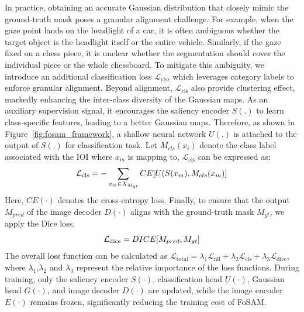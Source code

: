 \documentclass{article}
\begin{document}
In practice, obtaining an accurate Gaussian distribution that closely mimic the ground-truth mask poses a granular alignment challenge. For example, when the gaze point lands on the headlight of a car, it is often ambiguous whether the target object is the headlight itself or the entire vehicle. Similarly, if the gaze fixed on a chess piece, it is unclear whether the segmentation should cover the individual piece or the whole chessboard. To mitigate this ambiguity, we introduce an additional classification loss \(\mathcal{L}_{\mathrm{cls}}\), which leverages category labels to enforce granular alignment. Beyond alignment, \(\mathcal{L}_{\mathrm{cls}}\) also provide clustering effect, markedly enhancing the inter‑class diversity of the Gaussian maps. As an auxiliary supervision signal, it encourages the saliency encoder $S(.)$ to learn class‑specific features, leading to a better Gaussian maps. Therefore, as shown in Figure~\ref{fig:fosam_framework}, a shallow neural network $U(.)$ is attached to the output of $S(.)$ for classification task. Let $M_{cls}(x_{i})$ denote the class label associated with the IOI where $x_{m}$ is mapping to, $\mathcal{L}_{\mathrm{cls}}$ can be expressed as:
\begin{equation}
\label{eqn:loss2}
\small
\mathcal{L}_{\mathrm{cls}} = -\sum_{x_{m}\in X_{M_{gt}}} CE[U(S(x_{m}),M_{cls}(x_{m})]
\end{equation}
Here, $CE(\cdot)$ denotes the cross-entropy loss. Finally, to ensure that the output $M_{pred}$ of the image decoder $D(\cdot)$ aligns with the ground-truth mask $M_{gt}$, we apply the Dice loss.
\begin{equation}
\label{eqn:loss3}
\small
\mathcal{L}_{\mathrm{dice}} = DICE[M_{pred},M_{gt}]
\end{equation}
The overall loss function can be calculated as $\mathcal{L}_{\mathrm{total}} = \lambda_{1} \mathcal{L}_{\mathrm{nll}}+ \lambda_{2} \mathcal{L}_{\mathrm{cls}} + \lambda_{3} \mathcal{L}_{\mathrm{dice}}$, where $\lambda_{1}$,$\lambda_{2}$ and $\lambda_{3}$ represent the relative importance of the loss functions. During training, only the saliency encoder $S(\cdot)$, classification head $U(\cdot)$, Gaussian head $G(\cdot)$, and image decoder $D(\cdot)$ are updated, while the image encoder $E(\cdot)$ remains frozen, significantly reducing the training cost of FoSAM.
\end{document}
